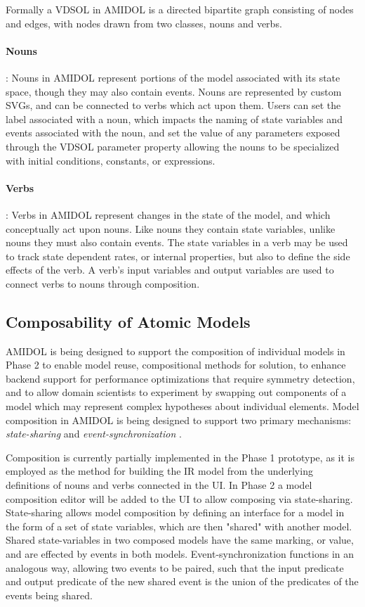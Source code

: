 \documentclass[11pt]{article}
\newcommand{\amidol}{\textsc{AMIDOL}}
\begin{document}
Formally a VDSOL in \amidol{} is a directed bipartite graph consisting of nodes and edges, with nodes drawn from two classes, nouns and verbs.

\paragraph{Nouns}: Nouns in \amidol{} represent portions of the model associated with its state space, though they may also contain events.  Nouns are represented by custom SVGs, and can be connected to verbs which act upon them.  Users can set the label associated with a noun, which impacts the naming of state variables and events associated with the noun, and set the value of any parameters exposed through the VDSOL parameter property allowing the nouns to be specialized with initial conditions, constants, or expressions.

\paragraph{Verbs}: Verbs in \amidol{} represent changes in the state of the model, and which conceptually act upon nouns.  Like nouns they contain state variables, unlike nouns they must also contain events.  The state variables in a verb may be used to track state dependent rates, or internal properties, but also to define the side effects of the verb.  A verb's input variables and output variables are used to connect verbs to nouns through composition.

\subsection{Composability of Atomic Models}

\amidol{} is being designed to support the composition of individual models in Phase 2 to enable model reuse, compositional methods for solution, to enhance backend support for performance optimizations that require symmetry detection, and to allow domain scientists to experiment by swapping out components of a model which may represent complex hypotheses about individual elements.  Model composition in \amidol{} is being designed to support two primary mechanisms: \emph{state-sharing} \cite{sanders1992dependability,sanders1988construction} and \emph{event-synchronization} \cite{lampka2002symbolic}.

Composition is currently partially implemented in the Phase 1 prototype, as it is employed as the method for building the IR model from the underlying definitions of nouns and verbs connected in the UI.  In Phase 2 a model composition editor will be added to the UI to allow composing via state-sharing. State-sharing allows model composition by defining an interface for a model in the form of a set of state variables, which are then "shared" with another model.  Shared state-variables in two composed models have the same marking, or value, and are effected by events in both models.  Event-synchronization functions in an analogous way, allowing two events to be paired, such that the input predicate and output predicate of the new shared event is the union of the predicates of the events being shared.
\end{document}
